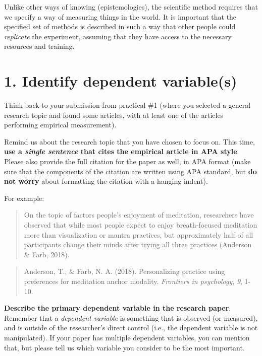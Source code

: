 \documentclass[
]{book}
\begin{document}
Unlike other ways of knowing (epistemologies), the scientific method requires that we specify a way of measuring things in the world. It is important that the specified set of methods is described in such a way that other people could \emph{replicate} the experiment, assuming that they have access to the necessary resources and training.

\section*{1. Identify dependent variable(s)}\label{identify-dependent-variables}

Think back to your submission from practical \#1 (where you selected a general research topic and found some articles, with at least one of the articles performing empirical measurement).

Remind us about the research topic that you have chosen to focus on. This time, \textbf{use a \emph{single sentence} that cites the empirical article in APA style}. Please also provide the full citation for the paper as well, in APA format (make sure that the components of the citation are written using APA standard, but \textbf{do not worry} about formatting the citation with a hanging indent).

For example:

\begin{quote}
On the topic of factors people's enjoyment of meditation, researchers have observed that while most people expect to enjoy breath-focused meditation more than visualization or mantra practices, but approximately half of all participants change their minds after trying all three practices (Anderson \& Farb, 2018).
\end{quote}

\begin{quote}
Anderson, T., \& Farb, N. A. (2018). Personalizing practice using preferences for meditation anchor modality. \emph{Frontiers in psychology}, \emph{9}, 1-10.
\end{quote}

\textbf{Describe the primary dependent variable in the research paper}. Remember that a \emph{dependent variable} is something that is observed (or measured), and is outside of the researcher's direct control (i.e., the dependent variable is not manipulated). If your paper has multiple dependent variables, you can mention that, but please tell us which variable you consider to be the most important.
\end{document}
